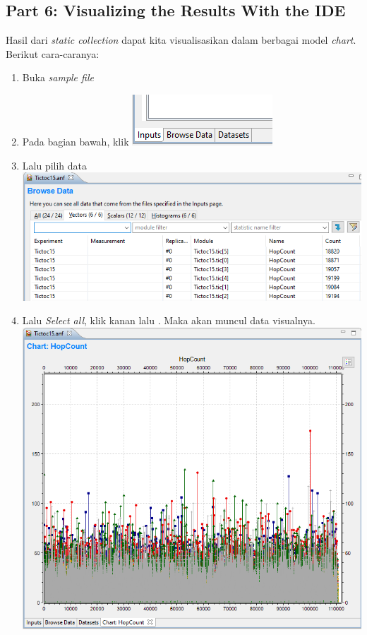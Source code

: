 \documentclass[conference]{IEEEtran}
\begin{document}
\subsection{Part 6: Visualizing the Results With the IDE}
Hasil dari \textit{static collection} dapat kita visualisasikan dalam berbagai model \textit{chart}. Berikut cara-caranya:
\begin{enumerate}
	\item Buka \textit{sample file} 
	\item Pada bagian bawah, klik 
	      \includegraphics[scale=0.65]{images/browse-data-tab.png}
	      \newpage
	\item Lalu pilih  data
	      \includegraphics[scale=0.27]{images/vector-data.png}
	\item Lalu \textit{Select all}, klik kanan lalu . Maka akan muncul data visualnya.
	      \includegraphics[scale=0.34]{images/plot-data.png}


\end{enumerate}
\end{document}
